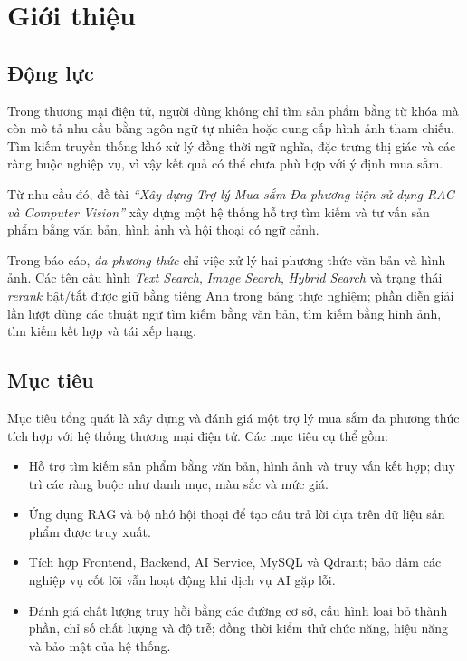 
\section{Giới thiệu}

\subsection{Động lực}
\indent Trong thương mại điện tử, người dùng không chỉ tìm sản phẩm bằng từ khóa mà còn mô tả nhu cầu bằng ngôn ngữ tự nhiên hoặc cung cấp hình ảnh tham chiếu. Tìm kiếm truyền thống khó xử lý đồng thời ngữ nghĩa, đặc trưng thị giác và các ràng buộc nghiệp vụ, vì vậy kết quả có thể chưa phù hợp với ý định mua sắm.

\indent Từ nhu cầu đó, đề tài \textit{\enquote{Xây dựng Trợ lý Mua sắm Đa phương tiện sử dụng RAG và Computer Vision}} xây dựng một hệ thống hỗ trợ tìm kiếm và tư vấn sản phẩm bằng văn bản, hình ảnh và hội thoại có ngữ cảnh.

\indent Trong báo cáo, \textit{đa phương thức} chỉ việc xử lý hai phương thức văn bản và hình ảnh. Các tên cấu hình \textit{Text Search}, \textit{Image Search}, \textit{Hybrid Search} và trạng thái \textit{rerank} bật/tắt được giữ bằng tiếng Anh trong bảng thực nghiệm; phần diễn giải lần lượt dùng các thuật ngữ tìm kiếm bằng văn bản, tìm kiếm bằng hình ảnh, tìm kiếm kết hợp và tái xếp hạng.

\subsection{Mục tiêu}
\indent Mục tiêu tổng quát là xây dựng và đánh giá một trợ lý mua sắm đa phương thức tích hợp với hệ thống thương mại điện tử. Các mục tiêu cụ thể gồm:
\begin{itemize}
    \item Hỗ trợ tìm kiếm sản phẩm bằng văn bản, hình ảnh và truy vấn kết hợp; duy trì các ràng buộc như danh mục, màu sắc và mức giá.
    \item Ứng dụng RAG và bộ nhớ hội thoại để tạo câu trả lời dựa trên dữ liệu sản phẩm được truy xuất.
    \item Tích hợp Frontend, Backend, AI Service, MySQL và Qdrant; bảo đảm các nghiệp vụ cốt lõi vẫn hoạt động khi dịch vụ AI gặp lỗi.
    \item Đánh giá chất lượng truy hồi bằng các đường cơ sở, cấu hình loại bỏ thành phần, chỉ số chất lượng và độ trễ; đồng thời kiểm thử chức năng, hiệu năng và bảo mật của hệ thống.
\end{itemize}

